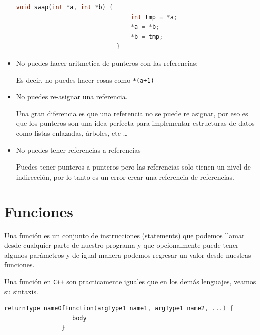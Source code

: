 \documentclass[12pt, fleqn]{report}                             %
\theoremstyle{break}                                            %
\newcommand{\textCode}[1]  { \texttt{#1} }                      %
\newcommand \Cpp  {\textCode{C++} }                               %
\begin{document}
\begin{itemize}
\begin{lstlisting}[language=C++, gobble=28]
                            void swap(int *a, int *b) {
                                int tmp = *a;
                                *a = *b;
                                *b = tmp;
                            }

                        \end{lstlisting}

                    \item No puedes hacer aritmetica de punteros con las referencias:

                        Es decir, no puedes hacer cosas como \textCode{*(a+1)}

                    \item No puedes re-asignar una referencia.

                        Una gran diferencia es que una referencia no se puede re asignar, por eso
                        es que los punteros son una idea perfecta para implementar estructuras de datos
                        como listas enlazadas, árboles, etc \dots

                    \item No puedes tener referencias a referencias
                    
                        Puedes tener punteros a punteros pero las referencias solo tienen un nivel de indirección,
                        por lo tanto es un error crear una referencia de referencias.
                \end{itemize}


  

        \section{Funciones}

            Una función es un conjunto de instrucciones (statements) que podemos llamar desde cualquier
            parte de nuestro programa y que opcionalmente puede tener algunos parámetros y de igual
            manera podemos regresar un valor desde nuestras funciones. 

            Una función en \Cpp son practicamente iguales que en los demás lenguajes, veamos su sintaxis.
            \begin{lstlisting}[language=C++, gobble=16]
                returnType nameOfFunction(argType1 name1, argType1 name2, ...) {
                   body
                }
            \end{lstlisting}
\end{document}
